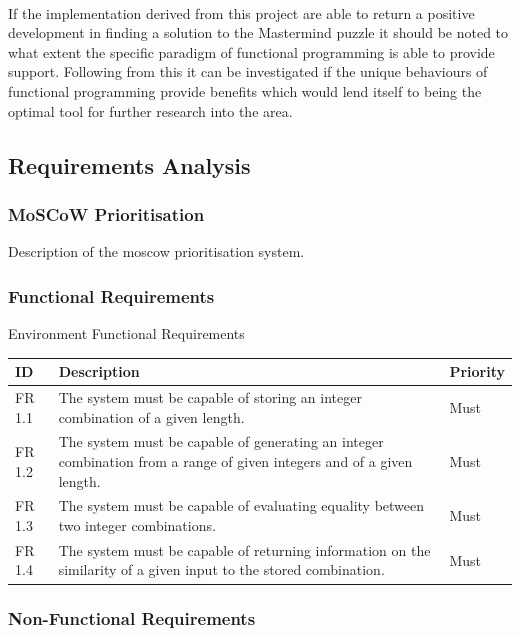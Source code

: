\documentclass[12pt]{article}  %
\theoremstyle{definition}
\theoremstyle{remark}
\begin{document}
\

If the implementation derived from this project are able to return a positive development in finding a solution to the Mastermind puzzle it should be noted to what extent the specific paradigm of functional programming is able to provide support. Following from this it can be investigated if the unique behaviours of functional programming provide benefits which would lend itself to being the optimal tool for further research into the area.
\subsection {Requirements Analysis}

\subsubsection {MoSCoW Prioritisation}

Description of the moscow prioritisation system.

\subsubsection {Functional Requirements}

Environment Functional Requirements

\begin{tabularx}{\textwidth}{|X|X|X|}
\hline
ID     & Description                                                                         & Priority \\ \hline
FR 1.1 & The system must be capable of storing an integer combination of a given length.     & Must     \\ \hline
FR 1.2 & The system must be capable of generating an integer combination from a range of given integers and of a given length. & Must \\ \hline
FR 1.3 & The system must be capable of evaluating equality between two integer combinations. & Must     \\ \hline
FR 1.4 & The system must be capable of returning information on the similarity of a given input to the stored combination.     & Must \\ \hline
\end{tabularx}



\subsubsection {Non-Functional Requirements}
\end{document}
